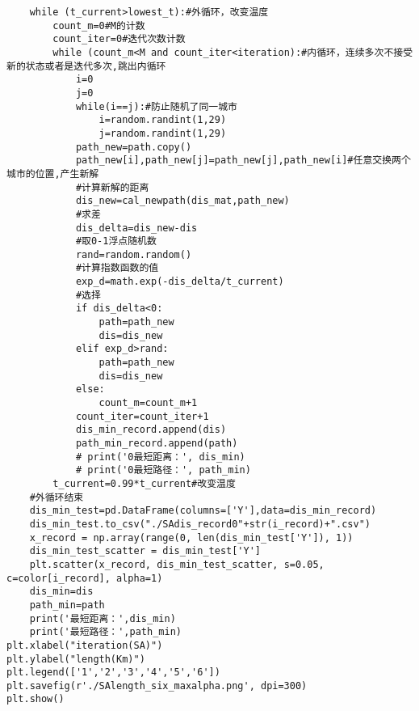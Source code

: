 \begin{lstlisting}
    while (t_current>lowest_t):#外循环，改变温度
        count_m=0#M的计数
        count_iter=0#迭代次数计数
        while (count_m<M and count_iter<iteration):#内循环，连续多次不接受新的状态或者是迭代多次,跳出内循环
            i=0
            j=0
            while(i==j):#防止随机了同一城市
                i=random.randint(1,29)
                j=random.randint(1,29)
            path_new=path.copy()
            path_new[i],path_new[j]=path_new[j],path_new[i]#任意交换两个城市的位置,产生新解
            #计算新解的距离
            dis_new=cal_newpath(dis_mat,path_new)
            #求差
            dis_delta=dis_new-dis
            #取0-1浮点随机数
            rand=random.random()
            #计算指数函数的值
            exp_d=math.exp(-dis_delta/t_current)
            #选择
            if dis_delta<0:
                path=path_new
                dis=dis_new
            elif exp_d>rand:
                path=path_new
                dis=dis_new
            else:
                count_m=count_m+1
            count_iter=count_iter+1
            dis_min_record.append(dis)
            path_min_record.append(path)
            # print('0最短距离：', dis_min)
            # print('0最短路径：', path_min)
        t_current=0.99*t_current#改变温度
    #外循环结束
    dis_min_test=pd.DataFrame(columns=['Y'],data=dis_min_record)
    dis_min_test.to_csv("./SAdis_record0"+str(i_record)+".csv")
    x_record = np.array(range(0, len(dis_min_test['Y']), 1))
    dis_min_test_scatter = dis_min_test['Y']
    plt.scatter(x_record, dis_min_test_scatter, s=0.05, c=color[i_record], alpha=1)
    dis_min=dis
    path_min=path
    print('最短距离：',dis_min)
    print('最短路径：',path_min)
plt.xlabel("iteration(SA)")
plt.ylabel("length(Km)")
plt.legend(['1','2','3','4','5','6'])
plt.savefig(r'./SAlength_six_maxalpha.png', dpi=300)
plt.show()
\end{lstlisting}
